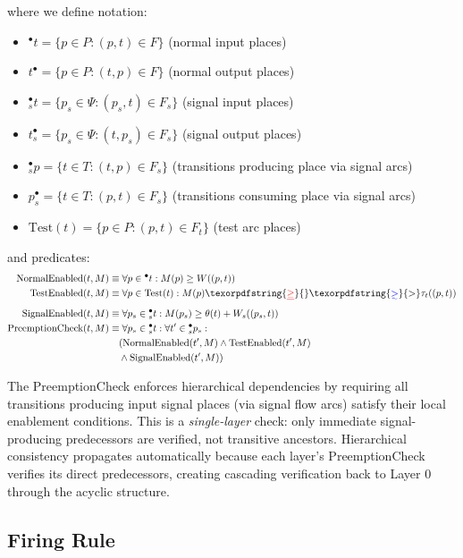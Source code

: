 \documentclass[10pt,letterpaper]{article}
\providecommand{\DIFaddtex}[1]{{\protect\color{blue}\uwave{#1}}} %
\providecommand{\DIFdeltex}[1]{{\protect\color{red}\sout{#1}}}                      %
\providecommand{\DIFaddbegin}{} %
\providecommand{\DIFaddend}{} %
\providecommand{\DIFdelbegin}{} %
\providecommand{\DIFdelend}{} %
\providecommand{\DIFadd}[1]{\texorpdfstring{\DIFaddtex{#1}}{#1}} %
\providecommand{\DIFdel}[1]{\texorpdfstring{\DIFdeltex{#1}}{}} %
\newcommand{\DIFscaledelfig}{0.5}
\newlength{\DIFdelgraphicswidth} %
\newlength{\DIFdelgraphicsheight} %
\newcommand{\DIFaddincludegraphics}[2][]{{\color{blue}\fbox{\DIFOincludegraphics[#1]{#2}}}} %
\newcommand{\DIFdelincludegraphics}[2][]{%
\sbox{\DIFdelgraphicsbox}{\DIFOincludegraphics[#1]{#2}}%
\settoboxwidth{\DIFdelgraphicswidth}{\DIFdelgraphicsbox} %
\settoboxtotalheight{\DIFdelgraphicsheight}{\DIFdelgraphicsbox} %
\scalebox{\DIFscaledelfig}{%
\parbox[b]{\DIFdelgraphicswidth}{\usebox{\DIFdelgraphicsbox}\\[-\baselineskip] \rule{\DIFdelgraphicswidth}{0em}}\llap{\resizebox{\DIFdelgraphicswidth}{\DIFdelgraphicsheight}{%
\setlength{\unitlength}{\DIFdelgraphicswidth}%
\begin{picture}(1,1)%
\thicklines\linethickness{2pt} %
{\color[rgb]{1,0,0}\put(0,0){\framebox(1,1){}}}%
{\color[rgb]{1,0,0}\put(0,0){\line( 1,1){1}}}%
{\color[rgb]{1,0,0}\put(0,1){\line(1,-1){1}}}%
\end{picture}%
}\hspace*{3pt}}} %
} %
\DeclareRobustCommand{\DIFaddbegin}{\DIFOaddbegin \let\includegraphics\DIFaddincludegraphics} %
\DeclareRobustCommand{\DIFaddend}{\DIFOaddend \let\includegraphics\DIFOincludegraphics} %
\DeclareRobustCommand{\DIFdelbegin}{\DIFOdelbegin \let\includegraphics\DIFdelincludegraphics} %
\DeclareRobustCommand{\DIFdelend}{\DIFOaddend \let\includegraphics\DIFOincludegraphics} %
\begin{document}
where we define notation:
\begin{itemize}
\item ${}^\bullet t = \{p \in P : (p,t) \in F\}$ (normal input places)
\item $t^\bullet = \{p \in P : (t,p) \in F\}$ (normal output places)
\item ${}^\bullet_s t = \{p_s \in \Psi : (p_s,t) \in F_s\}$ (signal input places)
\item $t^\bullet_s = \{p_s \in \Psi : (t,p_s) \in F_s\}$ (signal output places)
\item ${}^\bullet_s p = \{t \in T : (t,p) \in F_s\}$ (transitions producing place via signal arcs)
\item $p^\bullet_s = \{t \in T : (p,t) \in F_s\}$ (transitions consuming place via signal arcs)
\item $\text{Test}(t) = \{p \in P : (p,t) \in F_t\}$ (test arc places)
\end{itemize}

and predicates:
\begin{align}
\text{NormalEnabled}(t,M) &\equiv \forall p \in {}^\bullet t: M(p) \geq W((p,t)) \\
\text{TestEnabled}(t,M) &\equiv \forall p \in \text{Test}(t): M(p) \DIFdelbegin \DIFdel{\geq }\DIFdelend \DIFaddbegin \DIFadd{> }\DIFaddend \tau_t((p,t)) \\
\text{SignalEnabled}(t,M) &\equiv \forall p_s \in {}^\bullet_s t: M(p_s) \geq \theta(t) + W_s((p_s,t)) \\
\text{PreemptionCheck}(t,M) &\equiv \forall p_s \in {}^\bullet_s t: \forall t' \in {}^{\bullet}_s p_s: \nonumber \\
&\quad (\text{NormalEnabled}(t',M) \wedge \text{TestEnabled}(t',M) \nonumber \\
&\quad \wedge \text{SignalEnabled}(t',M))
\end{align}

The PreemptionCheck enforces hierarchical dependencies by requiring all transitions producing input signal places (via signal flow arcs) satisfy their local enablement conditions. This is a \textit{single-layer} check: only immediate signal-producing predecessors are verified, not transitive ancestors. Hierarchical consistency propagates automatically because each layer's PreemptionCheck verifies its direct predecessors, creating cascading verification back to Layer 0 through the acyclic structure.

\subsection{Firing Rule}
\end{document}
